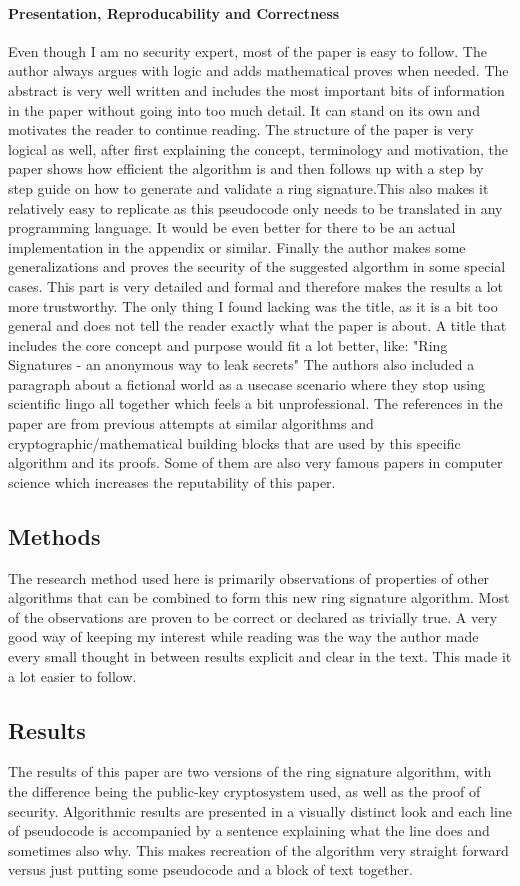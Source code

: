 \documentclass[11pt]{scrartcl}
\begin{document}
\paragraph{Presentation, Reproducability and Correctness}{
Even though I am no security expert, most of the paper is easy to follow. The author always argues with logic and adds mathematical proves when needed. 
The abstract is very well written and includes the most important bits of information in the paper without going into too much detail. It can stand on its own and motivates the reader to continue reading. The structure of the paper is very logical as well, after first explaining the concept,  terminology and motivation, the paper shows how efficient the algorithm is and then follows up with a step by step guide on how to generate and validate a ring signature.This also makes it relatively easy to replicate as this pseudocode only needs to be translated in any programming language. It would be even better for there to be an actual implementation in the appendix or similar. Finally the author makes some generalizations and proves the security of the suggested algorthm in some special cases. This part is very detailed and formal and therefore makes the results a lot more trustworthy.
The only thing I found lacking was the title, as it is a bit too general and does not tell the reader exactly what the paper is about. A title that includes the core concept and purpose would fit a lot better, like: "Ring Signatures - an anonymous way to leak secrets" 
The authors also included a paragraph about a fictional world as a usecase scenario where they stop using scientific lingo all together which feels a bit unprofessional.
The references in the paper are from previous attempts at similar algorithms and cryptographic/mathematical building blocks that are used by this specific algorithm and its proofs. Some of them are also very famous papers in computer science which increases the reputability of this paper.
}
\subsection{Methods}
The research method used here is primarily observations of properties of other algorithms that can be combined to form this new ring signature algorithm. Most of the observations are proven to be correct or declared as trivially true. A very good way of keeping my interest while reading was the way the author made every small thought in between results explicit and clear in the text. This made it a lot easier to follow.

\subsection{Results}
The results of this paper are two versions of the ring signature algorithm, with the difference being the public-key cryptosystem used, as well as the proof of security. Algorithmic results are presented in a visually distinct look and each line of pseudocode is accompanied by a sentence explaining what the line does and sometimes also why. This makes recreation of the algorithm very straight forward versus just putting some pseudocode and a block of text together.




\end{document}
